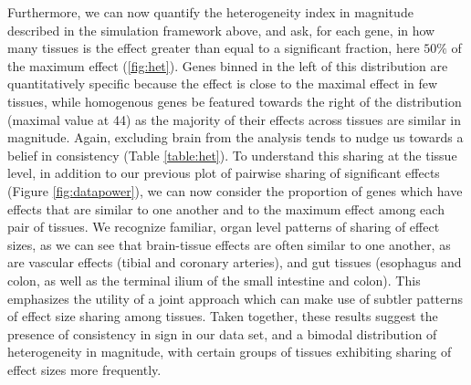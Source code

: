 Furthermore, we can now quantify the heterogeneity index in magnitude described in the simulation framework above, and ask, for each gene, in how many tissues is the effect greater than equal to a significant fraction, here $50\%$ of the maximum effect (\ref{fig:het}). Genes binned in the left of this distribution are quantitatively specific because the effect is close to the maximal effect in few tissues, while homogenous genes be featured towards the right of the distribution (maximal value at 44) as the majority of their effects across tissues are similar in magnitude. Again, excluding brain from the analysis tends to nudge us towards a belief in consistency (Table \ref{table:het}). To understand this sharing at the tissue level, in addition to our previous plot of pairwise sharing of significant effects (Figure \ref{fig:datapower}), we can now consider the proportion of genes which have effects that are similar to one another and to the maximum effect among each pair of tissues. We recognize familiar, organ level patterns of sharing of effect sizes, as we can see that brain-tissue effects are often similar to one another, as are vascular effects (tibial and coronary arteries), and gut tissues (esophagus and colon, as well as the terminal ilium of the small intestine and colon). This emphasizes the utility of a joint approach which can make use of subtler patterns of effect size sharing among tissues.
Taken together, these results suggest the presence of consistency in sign in our data set, and a bimodal distribution of heterogeneity in magnitude, with certain groups of tissues exhibiting sharing of effect sizes more frequently.

